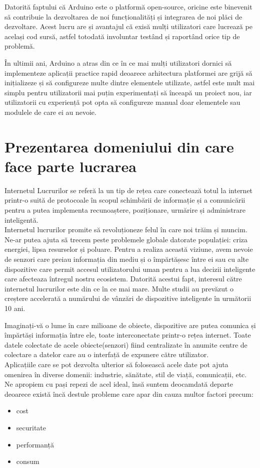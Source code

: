 \documentclass[12pt,a4paper]{report}
\begin{document}
Datorită faptului că Arduino este o platformă open-source, oricine este binevenit să contribuie la dezvoltarea de noi funcționalități și integrarea de noi plăci de dezvoltare. Acest lucru are și avantajul că exisă mulți utilizatori care lucrează pe același cod sursă, astfel totodată involuntar testând și raportând orice tip de problemă.

În ultimii ani, Arduino a atras din ce în ce mai mulți utilizatori dornici să implementeze aplicații practice rapid deoarece arhitectura platformei are grijă să inițializeze și să configureze multe dintre elementele utilizate, astfel este mult mai simplu pentru utilizatorii mai puțin experimentați să înceapă un proiect nou, iar utilizatorii cu experiență pot opta să configureze manual doar elementele sau modulele de care ei au nevoie. 

\chapter{Prezentarea domeniului din care face parte lucrarea}
Internetul Lucrurilor se referă la un tip de rețea care conectează totul la internet printr-o suită de protocoale în scopul schimbării de informație și a comunicării pentru a putea implementa recunoaștere, poziționare, urmărire și administrare inteligentă\cite{theiot}. \\
Internetul lucrurilor promite să revoluționeze felul în care noi trăim și muncim. Ne-ar putea ajuta să trecem peste problemele globale datorate populației: criza energiei, lipsa resurselor și poluare. Pentru a realiza această viziune, avem nevoie de senzori care preiau informația din mediu și o împărtășesc între ei sau cu alte dispozitive care permit accesul utilizatorului uman pentru a lua decizii inteligente care afecteaza întregul nostru ecosistem.
Datorită acestui fapt, interesul către internetul lucrurilor este din ce în ce mai mare. Multe studii au prevăzut o creștere accelerată a numărului de vânzări de dispozitive inteligente în următorii 10 ani.

Imaginați-vă o lume în care milioane de obiecte, dispozitive are putea comunica și împărtăși informația între ele, toate interconectate printr-o rețea internet. Toate datele colectate de acele obiecte(senzori) fiind centralizate în anumite centre de colectare a datelor care au o interfață de expunere către utilizator. \\
Aplicațiile care se pot dezvolta ulterior să folosească acele date pot ajuta omenirea în diverse domenii: industrie, sănătate, stil de viață, comunicații, etc.
Ne apropiem cu pași repezi de acel ideal, însă suntem deocamdată departe deoarece există încă destule probleme care apar din cauza multor factori precum:
\begin{itemize}
	\item cost
	\item securitate
	\item performanță
	\item consum
\end{itemize}
\end{document}
